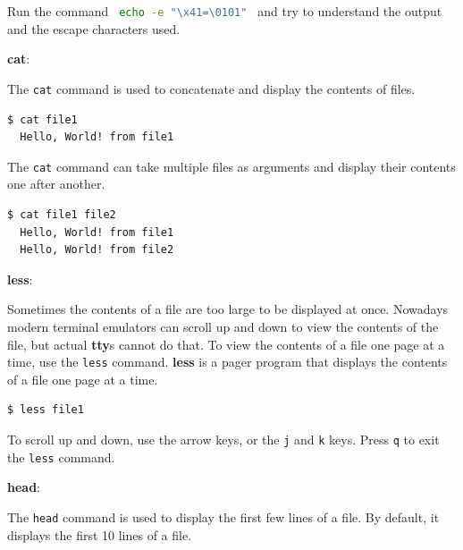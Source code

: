 \begin{exercise}
  Run the command
  \lstinline[language=bash]{ echo -e "\x41=\0101" } and try to understand the output and the escape characters used.
\end{exercise}

\textbf{cat}:

The \texttt{cat} command is used to concatenate and display the contents of files.

\begin{lstlisting}[language=bash]
  $ cat file1
  Hello, World! from file1
\end{lstlisting}

The \texttt{cat} command can take multiple files as arguments and display their contents one after another.

\begin{lstlisting}[language=bash]
  $ cat file1 file2
  Hello, World! from file1
  Hello, World! from file2
\end{lstlisting}

\textbf{less}:

Sometimes the contents of a file are too large to be displayed at once.
Nowadays modern terminal emulators can scroll up and down to view the contents of the file,
but actual \textbf{tty}s cannot do that.
To view the contents of a file one page at a time, use the \texttt{less} command.
\textbf{less} is a pager program that displays the contents of a file one page at a time.

\begin{lstlisting}[language=bash]
  $ less file1
\end{lstlisting}

To scroll up and down, use the arrow keys, or the \texttt{j} and \texttt{k} keys.
Press \texttt{q} to exit the \texttt{less} command.

\textbf{head}:

The \texttt{head} command is used to display the first few lines of a file.
By default, it displays the first 10 lines of a file.

